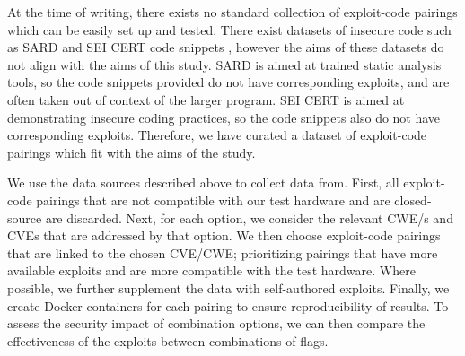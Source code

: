 At the time of writing, there exists no standard collection of exploit-code pairings which can be easily set up and tested. 
There exist datasets of insecure code such as SARD \citep{??} and SEI CERT code snippets \citep{??}, however the aims of these datasets do not align with the aims of this study. 
SARD is aimed at trained static analysis tools, so the code snippets provided do not have corresponding exploits, and are often taken out of context of the larger program. 
SEI CERT is aimed at demonstrating insecure coding practices, so the code snippets also do not have corresponding exploits. 
Therefore, we have curated a dataset of exploit-code pairings which fit with the aims of the study. 

We use the data sources described above to collect data from. 
First, all exploit-code pairings that are not compatible with our test hardware and are closed-source are discarded. 
Next, for each option, we consider the relevant CWE/s and CVEs that are addressed by that option. 
We then choose exploit-code pairings that are linked to the chosen CVE/CWE; prioritizing pairings that have more available exploits and are more compatible with the test hardware. 
Where possible, we further supplement the data with self-authored exploits. 
Finally, we create Docker containers for each pairing to ensure reproducibility of results. 
To assess the security impact of combination options, we can then compare the effectiveness of the exploits between combinations of flags. 

